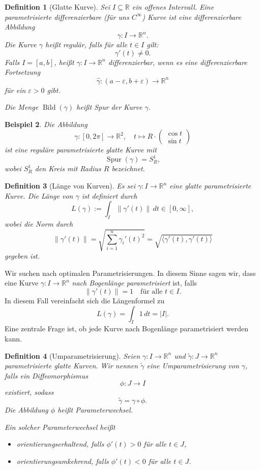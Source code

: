 \documentclass[a4paper,12pt]{article}
\theoremstyle{break}
\newtheorem{definition}{Definition}[section]
\newtheorem{example}[definition]{Beispiel}
\begin{document}
\begin{definition}[Glatte Kurve]
Sei \( I \subseteq \mathbb{R} \) ein offenes Intervall.  
Eine \emph{parametrisierte differenzierbare} (für uns \( C^\infty \)) \emph{Kurve} ist eine differenzierbare Abbildung  
\[
\gamma: I \to \mathbb{R}^n.
\]
Die Kurve \( \gamma \) heißt \emph{regulär}, falls für alle \( t \in I \) gilt:
\[
\gamma'(t) \neq 0.
\]
Falls \( I = [a,b] \), heißt \( \gamma: I \to \mathbb{R}^n \) \emph{differenzierbar}, wenn es eine differenzierbare Fortsetzung  
\[
\hat{\gamma}: (a-\varepsilon, b+\varepsilon) \to \mathbb{R}^n
\]
für ein \( \varepsilon > 0 \) gibt.  

Die Menge \( \operatorname{Bild}(\gamma) \) heißt \emph{Spur} der Kurve \( \gamma \).
\end{definition}

\begin{example}
Die Abbildung  
\[
\gamma: [0, 2\pi] \to \mathbb{R}^2, \quad t \mapsto R \cdot \begin{pmatrix} \cos t \\ \sin t \end{pmatrix}
\]
ist eine reguläre parametrisierte glatte Kurve mit  
\[
\operatorname{Spur}(\gamma) = S_R^1,
\]
wobei \( S_R^1 \) den Kreis mit Radius \( R \) bezeichnet.
\end{example}

\begin{definition}[Länge von Kurven]
Es sei \( \gamma: I \to \mathbb{R}^n \) eine glatte parametrisierte Kurve.  
Die \emph{Länge} von \( \gamma \) ist definiert durch  
\[
L(\gamma) := \int_I \|\gamma'(t)\| \, dt \in [0, \infty],
\]
wobei die Norm durch  
\[
\|\gamma'(t)\| = \sqrt{\sum_{i=1}^{n} \gamma_i'(t)^2} = \sqrt{\langle \gamma'(t), \gamma'(t) \rangle}
\]
gegeben ist.
\end{definition}

Wir suchen nach optimalen Parametrisierungen. In diesem Sinne sagen wir, dass eine Kurve  
\( \gamma: I \to \mathbb{R}^n \) \emph{nach Bogenlänge parametrisiert} ist, falls  
\[
\|\gamma'(t)\| = 1 \quad \text{für alle } t \in I.
\]
In diesem Fall vereinfacht sich die Längenformel zu  
\[
L(\gamma) = \int_I 1 \, dt = |I|.
\]
Eine zentrale Frage ist, ob jede Kurve nach Bogenlänge parametrisiert werden kann.

\begin{definition}[Umparametrisierung]
Seien \( \gamma: I \to \mathbb{R}^n \) und \( \tilde{\gamma}: J \to \mathbb{R}^n \) parametrisierte glatte Kurven.  
Wir nennen \( \tilde{\gamma} \) eine \emph{Umparametrisierung} von \( \gamma \), falls ein Diffeomorphismus  
\[
\phi: J \to I
\]
existiert, sodass  
\[
\tilde{\gamma} = \gamma \circ \phi.
\]
Die Abbildung \( \phi \) heißt \emph{Parameterwechsel}.  

Ein solcher Parameterwechsel heißt  
\begin{itemize}
    \item \emph{orientierungserhaltend}, falls \( \phi'(t) > 0 \) für alle \( t \in J \),
    \item \emph{orientierungsumkehrend}, falls \( \phi'(t) < 0 \) für alle \( t \in J \).
\end{itemize}
\end{definition}
\end{document}
